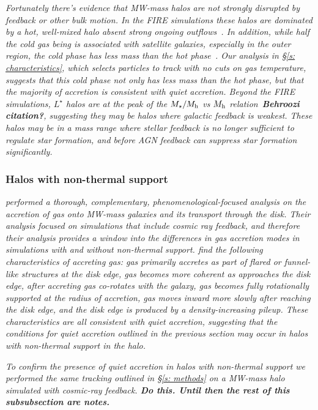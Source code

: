 \documentclass[fleqn,usenatbib]{mnras}
\begin{document}
\textit{
Fortunately there's evidence that MW-mass halos are not strongly disrupted by feedback or other bulk motion.
In the FIRE simulations these halos are dominated by a hot, well-mixed halo absent strong ongoing outflows~\citep{Hafen2019}.
In addition, while half the cold gas being is associated with satellite galaxies, especially in the outer region, the cold phase has less mass than the hot phase~\citep{Hafen2020}.
Our analysis in \S\ref{s: characteristics}, which selects particles to track with no cuts on gas temperature, suggests that this cold phase not only has less mass than the hot phase, but that the majority of accretion is consistent with quiet accretion.
Beyond the FIRE simulations, $L^\star$ halos are at the peak of the $M_\star/M_{\rm h}$ vs $M_{\rm h}$ relation~\textbf{Behroozi citation?}, suggesting they may be halos where galactic feedback is weakest.
These halos may be in a mass range where stellar feedback is no longer sufficient to regulate star formation, and before AGN feedback can suppress star formation significantly.
}

\subsubsection{Halos with non-thermal support}

\textit{
\cite{Trapp2021} performed a thorough, complementary, phenomenological-focused analysis on the accretion of gas onto MW-mass galaxies and its transport through the disk.
Their analysis focused on simulations that include cosmic ray feedback, and therefore their analysis provides a window into the differences in gas accretion modes in simulations with and without non-thermal support.
\citeauthor{Trapp2021} find the following characteristics of accreting gas:
gas primarily accretes as part of flared or funnel-like structures at the disk edge,
gas becomes more coherent as approaches the disk edge,
after accreting gas co-rotates with the galaxy,
gas becomes fully rotationally supported at the radius of accretion,
gas moves inward more slowly after reaching the disk edge,
and the disk edge is produced by a density-increasing pileup.
These characteristics are all consistent with quiet accretion, suggesting that the conditions for quiet accretion outlined in the previous section may occur in halos with non-thermal support in the halo.
}

\textit{
To confirm the presence of quiet accretion in halos with non-thermal support we performed the same tracking outlined in \S\ref{s: methods} on a MW-mass halo simulated with cosmic-ray feedback.
\textbf{Do this. Until then the rest of this subsubsection are notes.}
}
\end{document}
